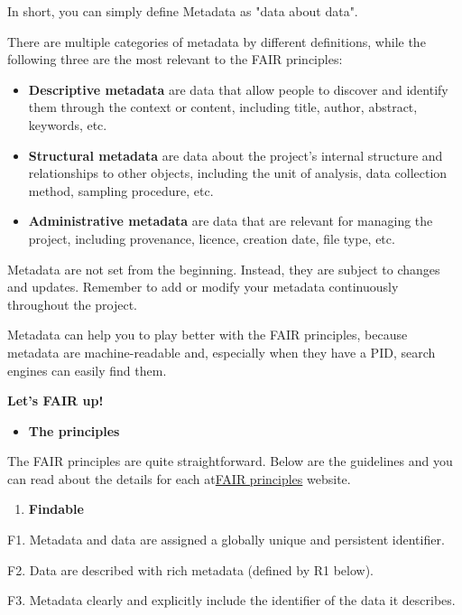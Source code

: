 \documentclass[
]{book}
\providecommand{\tightlist}{%
  \setlength{\itemsep}{0pt}\setlength{\parskip}{0pt}}
\begin{document}
In short, you can simply define Metadata as "data about data".

There are multiple categories of metadata by different definitions, while the following three are the most relevant to the FAIR principles:

\begin{itemize}
\item
  \textbf{Descriptive metadata} are data that allow people to discover and identify them through the context or content, including title, author, abstract, keywords, etc.
\item
  \textbf{Structural metadata} are data about the project's internal structure and relationships to other objects, including the unit of analysis, data collection method, sampling procedure, etc.
\item
  \textbf{Administrative metadata} are data that are relevant for managing the project, including provenance, licence, creation date, file type, etc.
\end{itemize}

Metadata are not set from the beginning. Instead, they are subject to changes and updates. Remember to add or modify your metadata continuously throughout the project.

Metadata can help you to play better with the FAIR principles, because metadata are machine-readable and, especially when they have a PID, search engines can easily find them.

\textbf{Let's FAIR up!}

\begin{itemize}
\tightlist
\item
  \textbf{The principles}
\end{itemize}

The FAIR principles are quite straightforward. Below are the guidelines and you can read about the details for each at\href{https://www.go-fair.org/fair-principles/}{FAIR principles} website.

\begin{enumerate}
\def\labelenumi{\arabic{enumi}.}
\tightlist
\item
  \textbf{Findable}
\end{enumerate}

F1. Metadata and data are assigned a globally unique and persistent identifier.

F2. Data are described with rich metadata (defined by R1 below).

F3. Metadata clearly and explicitly include the identifier of the data it describes.
\end{document}

